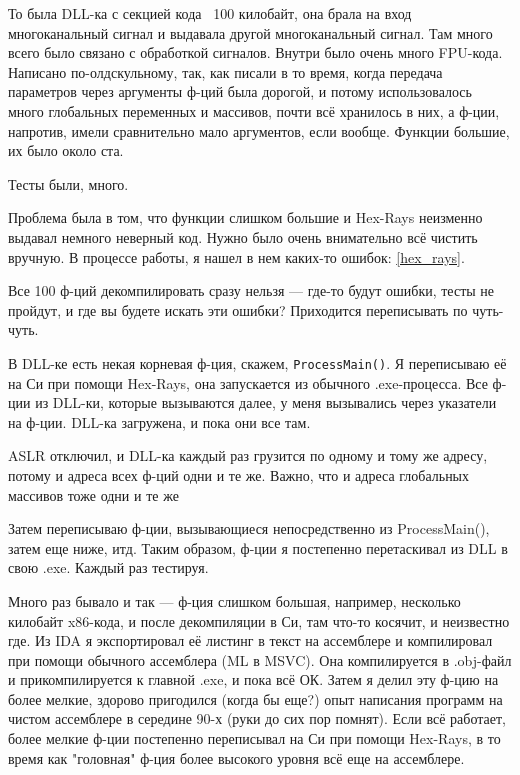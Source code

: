 
То была DLL-ка с секцией кода ~100 килобайт, она брала на вход многоканальный сигнал и выдавала другой многоканальный сигнал.
Там много всего было связано с обработкой сигналов.
Внутри было очень много FPU-кода.
Написано по-олдскульному, так, как писали в то время, когда передача параметров через аргументы ф-ций была дорогой,
и потому использовалось много глобальных переменных и массивов, почти всё хранилось в них, а ф-ции, напротив, имели сравнительно
мало аргументов, если вообще.
Функции большие, их было около ста.

Тесты были, много.

Проблема была в том, что функции слишком большие и Hex-Rays неизменно выдавал немного неверный код.
Нужно было очень внимательно всё чистить вручную.
В процессе работы, я нашел в нем каких-то ошибок: \ref{hex_rays}.

Все 100 ф-ций декомпилировать сразу нельзя --- где-то будут ошибки, тесты не пройдут, и где вы будете искать эти ошибки?
Приходится переписывать по чуть-чуть.

В DLL-ке есть некая корневая ф-ция, скажем, \verb|ProcessMain()|.
Я переписываю её на Си при помощи Hex-Rays, она запускается из обычного .exe-процесса.
Все ф-ции из DLL-ки, которые вызываются далее, у меня вызывались через указатели на ф-ции.
DLL-ка загружена, и пока они все там.

\ac{ASLR} отключил, и DLL-ка каждый раз грузится по одному и тому же адресу, потому и адреса всех ф-ций одни и те же.
Важно, что и адреса глобальных массивов тоже одни и те же

Затем переписываю ф-ции, вызывающиеся непосредственно из ProcessMain(), затем еще ниже, итд.
Таким образом, ф-ции я постепенно перетаскивал из DLL в свою .exe.
Каждый раз тестируя.

Много раз бывало и так --- ф-ция слишком большая, например, несколько килобайт x86-кода, и после декомпиляции в Си,
там что-то косячит, и неизвестно где.
Из IDA я экспортировал её листинг в текст на ассемблере и компилировал при помощи обычного ассемблера (ML в MSVC).
Она компилируется в .obj-файл и прикомпилируется к главной .exe, и пока всё ОК.
Затем я делил эту ф-цию на более мелкие, здорово пригодился (когда бы еще?) опыт написания программ на чистом ассемблере в середине
90-х (руки до сих пор помнят).
Если всё работает, более мелкие ф-ции постепенно переписывал на Си при помощи Hex-Rays, в то время как "головная" ф-ция более
высокого уровня всё еще на ассемблере.

